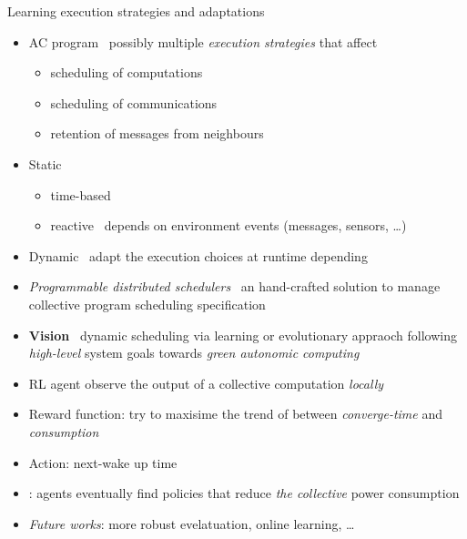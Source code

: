 \documentclass[8pt, aspectratio=169, handout]{beamer}
\begin{document}
\begin{frame}[allowframebreaks]{Learning execution strategies and adaptations}
  \begin{cardTiny}
    \begin{itemize}
    \item AC program \faArrowRight \, possibly multiple \emph{execution strategies} that affect
    \begin{itemize}
      \item scheduling of computations
      \item scheduling of communications
      \item retention of messages from neighbours
    \end{itemize}
    \end{itemize}
  \end{cardTiny}
  \begin{card}
    \begin{itemize}
      \item Static
      \begin{itemize}
        \item time-based
        \item reactive \faArrowRight \, depends on environment events (messages, sensors, \dots)
      \end{itemize}
      \item Dynamic \faArrowRight \,  adapt the execution choices at
      runtime depending
      \item \emph{Programmable distributed schedulers} \faArrowRight \, an hand-crafted solution to manage collective program scheduling specification
      \item \textbf{Vision} \faArrowRight \, dynamic scheduling via learning or evolutionary appraoch following \emph{high-level} system goals \faArrowRight towards \emph{green autonomic computing}
    \end{itemize}
  \end{card}
  \begin{card}
    \begin{itemize}
      \item RL agent observe the output of a collective computation \emph{locally}
      \item Reward function: try to maxisime the trend of between \emph{converge-time} and \emph{consumption}
      \item Action: next-wake up time
      \item {}: agents eventually find policies that reduce \emph{the collective} power consumption
      \item \emph{Future works}: more robust evelatuation, online learning, \dots
    \end{itemize}
  \end{card}
\end{frame}
\end{document}
